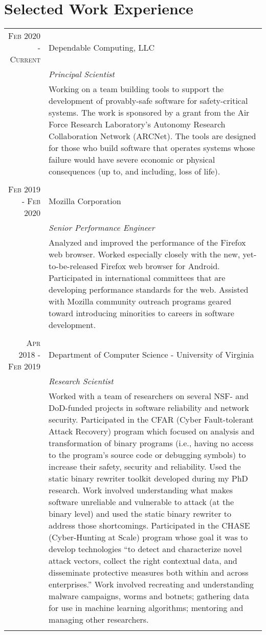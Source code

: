 \documentclass[a4paper,10pt]{article} %
\begin{document}
\section{Selected Work Experience}
\begin{tabular}{r|p{11cm}}

\textsc{Feb 2020 - Current} & Dependable Computing, LLC \\
& \emph{Principal Scientist}\\
& \footnotesize{Working on a team building tools to support the development of provably-safe software for safety-critical systems. The work is sponsored by a grant from the Air Force Research Laboratory's Autonomy Research Collaboration Network (ARCNet). The tools are designed for those who build software that operates systems whose failure would have severe economic or physical consequences (up to, and including, loss of life). }\\
\multicolumn{2}{c}{ } \\

\textsc{Feb 2019 - Feb 2020} & Mozilla Corporation \\
& \emph{Senior Performance Engineer}\\ 
& \footnotesize{Analyzed and improved the performance of the Firefox web browser. Worked especially closely with the new, yet-to-be-released Firefox web browser for Android. Participated in international committees that are developing performance standards for the web. Assisted with Mozilla community outreach programs geared toward introducing minorities to careers in software development.}\\
\multicolumn{2}{c}{ } \\

\textsc{Apr 2018 - Feb 2019} & Department of Computer Science - University of Virginia \\
& \emph{Research Scientist}\\ 
& \footnotesize{Worked with a team of researchers on several NSF- and DoD-funded projects in software reliability and network security. Participated in the CFAR (Cyber Fault-tolerant Attack Recovery) program which focused on analysis and transformation of binary programs (i.e., having no access to the program's source code or debugging symbols) to increase their safety, security and reliability. Used the static binary rewriter toolkit developed during my PhD research. Work involved understanding what makes software unreliable and vulnerable to attack (at the binary level) and used the static binary rewriter to address those shortcomings. Participated in the CHASE (Cyber-Hunting at Scale) program whose goal it was to develop technologies ``to detect and characterize novel attack vectors, collect the right contextual data, and disseminate protective measures both within and across enterprises.'' Work involved recreating and understanding malware campaigns, worms and botnets; gathering data for use in machine learning algorithms; mentoring and managing other researchers.}\\
\multicolumn{2}{c}{ } \\


\end{tabular}
\end{document}
